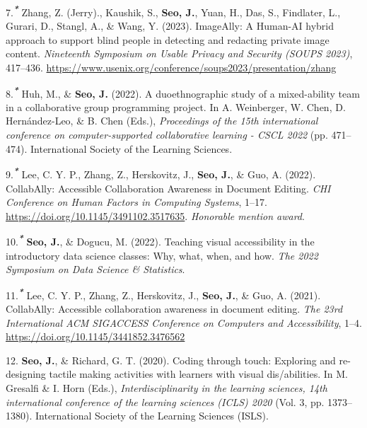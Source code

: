 \documentclass[11pt,a4paper,]{awesome-cv}
\newlength{\cslhangindent}
\newenvironment{CSLReferences}[2] %
 {\begin{list}{}{%
  \setlength{\itemindent}{0pt}
  \setlength{\leftmargin}{0pt}
  \setlength{\parsep}{0pt}
  \ifodd #1
   \setlength{\leftmargin}{\cslhangindent}
   \setlength{\itemindent}{-1\cslhangindent}
  \fi
  \setlength{\itemsep}{#2\baselineskip}}}
 {\end{list}}
\begin{document}
\begin{CSLReferences}{1}{0}
7.\textsuperscript{\textbf{\emph{*}}} Zhang, Z. (Jerry)., Kaushik, S.,
\textbf{Seo, J.}, Yuan, H., Das, S., Findlater, L., Gurari, D., Stangl,
A., \& Wang, Y. (2023). ImageAlly: A Human-AI hybrid approach to support
blind people in detecting and redacting private image content.
\emph{Nineteenth Symposium on Usable Privacy and Security (SOUPS 2023)},
417--436.
\url{https://www.usenix.org/conference/soups2023/presentation/zhang}

8.\textsuperscript{\textbf{\emph{*}}} Huh, M., \& \textbf{Seo, J.}
(2022). A duoethnographic study of a mixed-ability team in a
collaborative group programming project. In A. Weinberger, W. Chen, D.
Hernández-Leo, \& B. Chen (Eds.), \emph{Proceedings of the 15th
international conference on computer-supported collaborative learning -
CSCL 2022} (pp. 471--474). International Society of the Learning
Sciences.

9.\textsuperscript{\textbf{\emph{*}}} Lee, C. Y. P., Zhang, Z.,
Herskovitz, J., \textbf{Seo, J.}, \& Guo, A. (2022). CollabAlly:
Accessible Collaboration Awareness in Document Editing. \emph{CHI
Conference on Human Factors in Computing Systems}, 1--17.
\url{https://doi.org/10.1145/3491102.3517635}. \emph{Honorable mention
award}.

10.\textsuperscript{\textbf{\emph{*}}} \textbf{Seo, J.}, \& Dogucu, M.
(2022). Teaching visual accessibility in the introductory data science
classes: Why, what, when, and how. \emph{The 2022 Symposium on Data
Science \& Statistics}.

11.\textsuperscript{\textbf{\emph{*}}} Lee, C. Y. P., Zhang, Z.,
Herskovitz, J., \textbf{Seo, J.}, \& Guo, A. (2021). CollabAlly:
Accessible collaboration awareness in document editing. \emph{The 23rd
International ACM SIGACCESS Conference on Computers and Accessibility},
1--4. \url{https://doi.org/10.1145/3441852.3476562}

12. \textbf{Seo, J.}, \& Richard, G. T. (2020). Coding through touch:
Exploring and re-designing tactile making activities with learners with
visual dis/abilities. In M. Gresalfi \& I. Horn (Eds.),
\emph{Interdisciplinarity in the learning sciences, 14th international
conference of the learning sciences (ICLS) 2020} (Vol. 3, pp.
1373--1380). International Society of the Learning Sciences (ISLS).


\end{CSLReferences}
\end{document}
